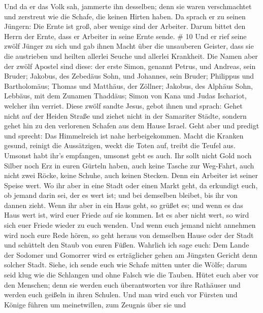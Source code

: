 Und da er das Volk sah, jammerte ihn desselben; denn sie waren
verschmachtet und zerstreut wie die Schafe, die keinen Hirten haben.
 Da sprach er zu seinen Jüngern: Die Ernte ist groß, aber
wenige sind der Arbeiter.  Darum bittet den Herrn der
Ernte, dass er Arbeiter in seine Ernte sende. \# 10  Und er
rief seine zwölf Jünger zu sich und gab ihnen Macht über die unsauberen
Geister, dass sie die austrieben und heilten allerlei Seuche und
allerlei Krankheit.  Die Namen aber der zwölf Apostel sind
diese: der erste Simon, genannt Petrus, und Andreas, sein Bruder;
Jakobus, des Zebedäus Sohn, und Johannes, sein Bruder; 
Philippus und Bartholomäus; Thomas und Matthäus, der Zöllner; Jakobus,
des Alphäus Sohn, Lebbäus, mit dem Zunamen Thaddäus;  Simon
von Kana und Judas Ischariot, welcher ihn verriet.  Diese
zwölf sandte Jesus, gebot ihnen und sprach: Gehet nicht auf der Heiden
Straße und ziehet nicht in der Samariter Städte,  sondern
gehet hin zu den verlorenen Schafen aus dem Hause Israel. 
Geht aber und predigt und sprecht: Das Himmelreich ist nahe
herbeigekommen.  Macht die Kranken gesund, reinigt die
Aussätzigen, weckt die Toten auf, treibt die Teufel aus. Umsonst habt
ihr's empfangen, umsonst gebt es auch.  Ihr sollt nicht Gold
noch Silber noch Erz in euren Gürteln haben,  auch keine
Tasche zur Weg-Fahrt, auch nicht zwei Röcke, keine Schuhe, auch keinen
Stecken. Denn ein Arbeiter ist seiner Speise wert.  Wo ihr
aber in eine Stadt oder einen Markt geht, da erkundigt euch, ob jemand
darin sei, der es wert ist; und bei demselben bleibet, bis ihr von
dannen zieht.  Wenn ihr aber in ein Haus geht, so grüßet
es;  und wenn es das Haus wert ist, wird euer Friede auf
sie kommen. Ist es aber nicht wert, so wird sich euer Friede wieder zu
euch wenden.  Und wenn euch jemand nicht annehmen wird noch
eure Rede hören, so geht heraus von demselben Hause oder der Stadt und
schüttelt den Staub von euren Füßen.  Wahrlich ich sage
euch: Dem Lande der Sodomer und Gomorrer wird es erträglicher gehen am
Jüngsten Gericht denn solcher Stadt.  Siehe, ich sende euch
wie Schafe mitten unter die Wölfe; darum seid klug wie die Schlangen und
ohne Falsch wie die Tauben.  Hütet euch aber vor den
Menschen; denn sie werden euch überantworten vor ihre Rathäuser und
werden euch geißeln in ihren Schulen.  Und man wird euch
vor Fürsten und Könige führen um meinetwillen, zum Zeugnis über sie und
